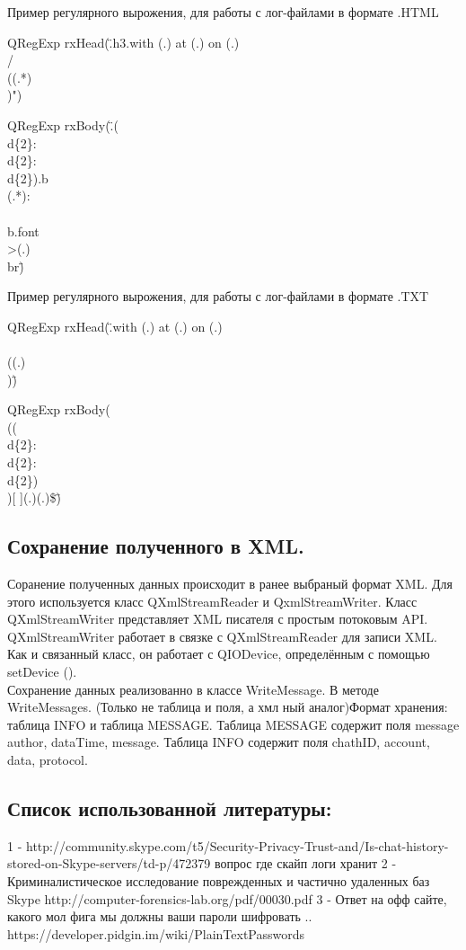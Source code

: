 Пример регулярного вырожения, для работы с лог-файлами в формате .HTML

QRegExp rxHead(\".\*h3.\*with (.\*) at (.\*) on (.\*)\\/ \\((.*)\\)")

QRegExp rxBody(\".\*(\\d\{2\}:\\d\{2\}:\\d\{2\}).\*b\\\>(.*):\\\<\\\/b.\*font\\>(.\*)\\\<br\")


Пример регулярного вырожения, для работы с лог-файлами в формате .TXT

QRegExp rxHead(\".\*with (.\*) at (.\*) on (.\*)\\\/ \\((.\*)\\)\")

QRegExp rxBody(\"\\((\\d\{2\}:\\d\{2\}:\\d\{2\})\\)[ ]\*(.\*)\:(.\*)\$\")

\subsection{Сохранение полученного в XML.}

Соранение полученных данных происходит в ранее выбраный формат XML. Для этого используется класс QXmlStreamReader и QxmlStreamWriter.
Класс QXmlStreamWriter представляет XML писателя с простым потоковым API.\\

QXmlStreamWriter работает в связке с QXmlStreamReader для записи XML. Как и связанный класс, он работает с QIODevice, определённым с помощью setDevice ().\\

Сохранение данных реализованно в классе WriteMessage. В методе WriteMessages. (Только не таблица и поля, а хмл ный аналог)Формат хранения: таблица INFO и таблица MESSAGE. Таблица MESSAGE содержит поля message author, dataTime, message.	Таблица INFO содержит поля chathID, account, data, protocol.\\

\subsection{Список использованной литературы:}
1 -  http://community.skype.com/t5/Security-Privacy-Trust-and/Is-chat-history-stored-on-Skype-servers/td-p/472379 вопрос где скайп логи хранит
2 - Криминалистическое исследование поврежденных и частично удаленных баз Skype http://computer-forensics-lab.org/pdf/00030.pdf
3 - Ответ на офф сайте, какого мол фига мы должны ваши пароли шифровать .. https://developer.pidgin.im/wiki/PlainTextPasswords